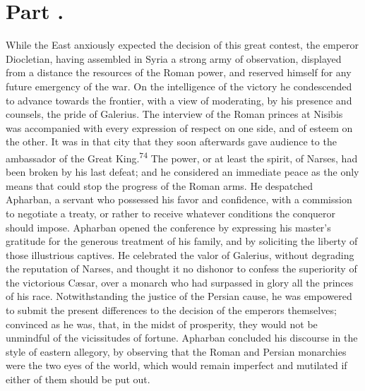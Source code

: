 




\section{Part \thesection.}

While the East anxiously expected the decision of this great
contest, the emperor Diocletian, having assembled in Syria a
strong army of observation, displayed from a distance the
resources of the Roman power, and reserved himself for any future
emergency of the war. On the intelligence of the victory he
condescended to advance towards the frontier, with a view of
moderating, by his presence and counsels, the pride of Galerius.
The interview of the Roman princes at Nisibis was accompanied
with every expression of respect on one side, and of esteem on
the other. It was in that city that they soon afterwards gave
audience to the ambassador of the Great King.\textsuperscript{74} The power, or at
least the spirit, of Narses, had been broken by his last defeat;
and he considered an immediate peace as the only means that could
stop the progress of the Roman arms. He despatched Apharban, a
servant who possessed his favor and confidence, with a commission
to negotiate a treaty, or rather to receive whatever conditions
the conqueror should impose. Apharban opened the conference by
expressing his master’s gratitude for the generous treatment of
his family, and by soliciting the liberty of those illustrious
captives. He celebrated the valor of Galerius, without degrading
the reputation of Narses, and thought it no dishonor to confess
the superiority of the victorious Cæsar, over a monarch who had
surpassed in glory all the princes of his race. Notwithstanding
the justice of the Persian cause, he was empowered to submit the
present differences to the decision of the emperors themselves;
convinced as he was, that, in the midst of prosperity, they would
not be unmindful of the vicissitudes of fortune. Apharban
concluded his discourse in the style of eastern allegory, by
observing that the Roman and Persian monarchies were the two eyes
of the world, which would remain imperfect and mutilated if
either of them should be put out.

